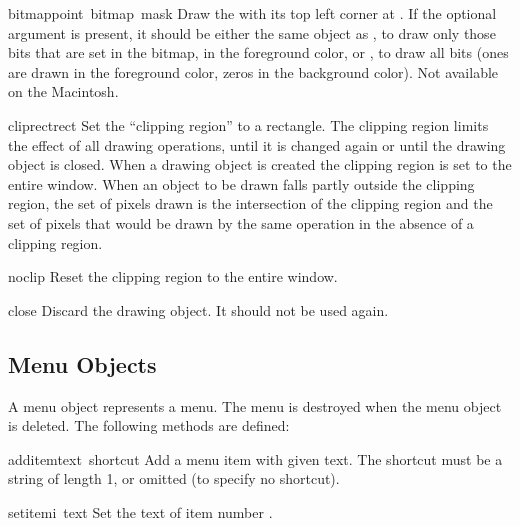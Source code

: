 \begin{funcdesc}{bitmap}{point\, bitmap\, mask}
Draw the  with its top left corner at .
If the optional  argument is present, it should be either
the same object as , to draw only those bits that are set
in the bitmap, in the foreground color, or , to draw all
bits (ones are drawn in the foreground color, zeros in the background
color).
Not available on the Macintosh.
\end{funcdesc}

\begin{funcdesc}{cliprect}{rect}
Set the ``clipping region'' to a rectangle.
The clipping region limits the effect of all drawing operations, until
it is changed again or until the drawing object is closed.  When a
drawing object is created the clipping region is set to the entire
window.  When an object to be drawn falls partly outside the clipping
region, the set of pixels drawn is the intersection of the clipping
region and the set of pixels that would be drawn by the same operation
in the absence of a clipping region.
\end{funcdesc}

\begin{funcdesc}{noclip}{}
Reset the clipping region to the entire window.
\end{funcdesc}

\begin{funcdesc}{close}{}
Discard the drawing object.  It should not be used again.
\end{funcdesc}

\subsection{Menu Objects}

A menu object represents a menu.
The menu is destroyed when the menu object is deleted.
The following methods are defined:

\renewcommand{\indexsubitem}{(menu method)}

\begin{funcdesc}{additem}{text\, shortcut}
Add a menu item with given text.
The shortcut must be a string of length 1, or omitted (to specify no
shortcut).
\end{funcdesc}

\begin{funcdesc}{setitem}{i\, text}
Set the text of item number
.
\end{funcdesc}

